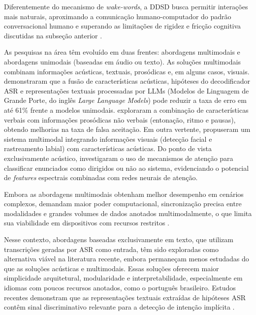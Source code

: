 \documentclass[
    12pt,                %
    openright,           %
    oneside,             %
    a4paper,             %
    english,             %
    brazil               %
]{abntex2}
\begin{document}
Diferentemente do mecanismo de \textit{wake-words}, a DDSD busca permitir interações mais naturais, aproximando a comunicação humano-computador do padrão conversacional humano e superando as limitações de rigidez e fricção cognitiva discutidas na subseção anterior \cite{Nie2021}.

As pesquisas na área têm evoluído em duas frentes: abordagens multimodais e abordagens unimodais (baseadas em áudio ou texto). As soluções multimodais combinam informações acústicas, textuais, prosódicas e, em alguns casos, visuais.  demonstraram que a fusão de características acústicas, hipóteses do decodificador ASR e representações textuais processadas por LLMs (Modelos de Linguagem de Grande Porte, do inglês \textit{Large Language Models}) pode reduzir a taxa de erro em até 61\% frente a modelos unimodais.  exploraram a combinação de características verbais com informações prosódicas não verbais (entonação, ritmo e pausas), obtendo melhorias na taxa de falsa aceitação. Em outra vertente,  propuseram um sistema multimodal integrando informações visuais (detecção facial e rastreamento labial) com características acústicas. Do ponto de vista exclusivamente acústico,  investigaram o uso de mecanismos de atenção para classificar enunciados como dirigidos ou não ao sistema, evidenciando o potencial de \textit{features} espectrais combinadas com redes neurais de atenção.

Embora as abordagens multimodais obtenham melhor desempenho em cenários complexos, demandam maior poder computacional, sincronização precisa entre modalidades e grandes volumes de dados anotados multimodalmente, o que limita sua viabilidade em dispositivos com recursos restritos \cite{Wagner2024}. 

Nesse contexto, abordagens baseadas exclusivamente em texto, que utilizam transcrições geradas por ASR como entrada, têm sido exploradas como alternativa viável na literatura recente, embora permaneçam menos estudadas do que as soluções acústicas e multimodais. Essas soluções oferecem maior simplicidade arquitetural, modularidade e interpretabilidade, especialmente em idiomas com poucos recursos anotados, como o português brasileiro. Estudos recentes demonstram que as representações textuais extraídas de hipóteses ASR contêm sinal discriminativo relevante para a detecção de intenção implícita \cite{Dighe2024, Wagner2024}.

\end{document}

